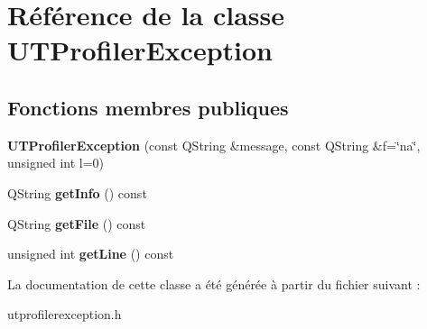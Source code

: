 \hypertarget{class_u_t_profiler_exception}{\section{Référence de la classe U\+T\+Profiler\+Exception}
\label{class_u_t_profiler_exception}
}
\subsection*{Fonctions membres publiques}
\begin{DoxyCompactItemize}
\item 
\hypertarget{class_u_t_profiler_exception_afd289268648bada41417156ceb1269fd}{{\bfseries U\+T\+Profiler\+Exception} (const Q\+String \&message, const Q\+String \&f=\char`\"{}na\char`\"{}, unsigned int l=0)}\label{class_u_t_profiler_exception_afd289268648bada41417156ceb1269fd}

\item 
\hypertarget{class_u_t_profiler_exception_a6f4582234c00b4fe67776ef10c5370bf}{Q\+String {\bfseries get\+Info} () const }\label{class_u_t_profiler_exception_a6f4582234c00b4fe67776ef10c5370bf}

\item 
\hypertarget{class_u_t_profiler_exception_ae54e6a5c0836dcc62fee879651ae5679}{Q\+String {\bfseries get\+File} () const }\label{class_u_t_profiler_exception_ae54e6a5c0836dcc62fee879651ae5679}

\item 
\hypertarget{class_u_t_profiler_exception_aa3c2efb28c6b482859b26b8f59b4b32e}{unsigned int {\bfseries get\+Line} () const }\label{class_u_t_profiler_exception_aa3c2efb28c6b482859b26b8f59b4b32e}

\end{DoxyCompactItemize}


La documentation de cette classe a été générée à partir du fichier suivant \+:\begin{DoxyCompactItemize}
\item 
utprofilerexception.\+h\end{DoxyCompactItemize}
